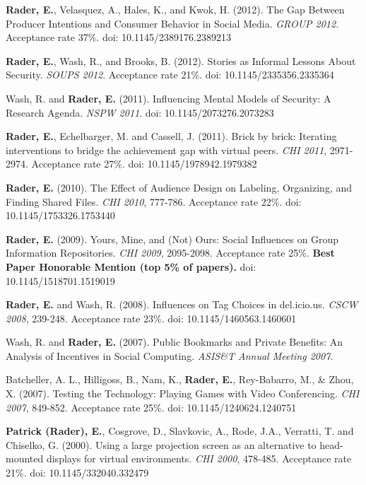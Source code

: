 \documentclass[9pt]{extarticle}
\begin{document}
\textbf{Rader, E.}, Velasquez, A., Hales, K., and Kwok, H. (2012). The Gap Between Producer Intentions and Consumer Behavior in Social Media. \emph{GROUP 2012}. Acceptance rate 37\%. doi: 10.1145/2389176.2389213

\textbf{Rader, E.}, Wash, R., and Brooks, B. (2012). Stories as Informal Lessons About Security. \emph{SOUPS 2012}. Acceptance rate 21\%. doi: 10.1145/2335356.2335364

Wash, R. and \textbf{Rader, E.} (2011). Influencing Mental Models of Security: A Research Agenda. \emph{NSPW 2011}. doi: 10.1145/2073276.2073283

\textbf{Rader, E.}, Echelbarger, M. and Cassell, J. (2011). Brick by brick: Iterating interventions to bridge the achievement gap with virtual peers. \emph{CHI 2011}, 2971-2974. Acceptance rate 27\%. doi: 10.1145/1978942.1979382

\textbf{Rader, E.} (2010). The Effect of Audience Design on Labeling, Organizing, and Finding Shared Files. \emph{CHI 2010}, 777-786. Acceptance rate 22\%. doi: 10.1145/1753326.1753440

\textbf{Rader, E.} (2009). Yours, Mine, and (Not) Ours: Social Influences on Group Information Repositories. \emph{CHI 2009}, 2095-2098. Acceptance rate 25\%. \textbf{Best Paper Honorable Mention (top 5\% of papers).} doi: 10.1145/1518701.1519019

\textbf{Rader, E.} and Wash, R. (2008). Influences on Tag Choices in del.icio.us. \emph{CSCW 2008}, 239-248. Acceptance rate 23\%. doi: 10.1145/1460563.1460601

Wash, R. and \textbf{Rader, E.} (2007). Public Bookmarks and Private Benefits: An Analysis of Incentives in Social Computing. \emph{ASIS\&T Annual Meeting 2007.}

Batcheller, A. L., Hilligoss, B., Nam, K., \textbf{Rader, E.}, Rey-Babarro, M., \& Zhou, X. (2007). Testing the Technology: Playing Games with Video Conferencing. \emph{CHI 2007}, 849-852. Acceptance rate 25\%. doi: 10.1145/1240624.1240751

\textbf{Patrick (Rader), E.}, Cosgrove, D., Slavkovic, A., Rode, J.A., Verratti, T. and Chiselko, G. (2000). Using a large projection screen as an alternative to head-mounted displays for virtual environments. \emph{CHI 2000}, 478-485. Acceptance rate 21\%. doi: 10.1145/332040.332479
\end{document}
